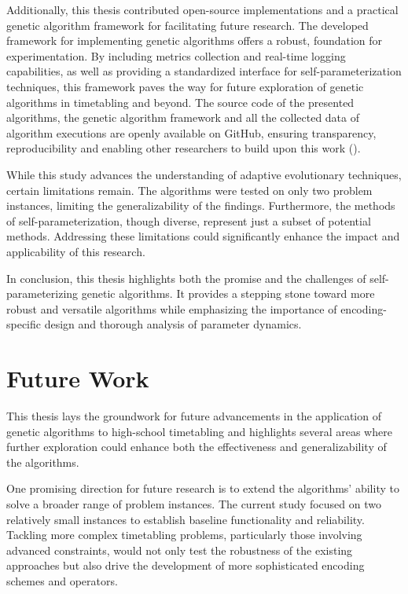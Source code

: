 \documentclass[english,examples]{isasthesis}
\begin{document}
Additionally, this thesis contributed open-source implementations and a
practical genetic algorithm framework for facilitating future research.
The developed framework for implementing genetic algorithms offers a robust,
foundation for experimentation. By including metrics collection and real-time
logging capabilities, as well as providing a standardized interface for
self-parameterization techniques, this framework paves the way for future
exploration of genetic algorithms in timetabling and beyond.
The source code of the presented algorithms, the genetic algorithm framework
and all the collected data of algorithm executions are openly available
on GitHub, ensuring transparency, reproducibility and enabling other
researchers to build upon this work (\cite{code-gax,code-gax-plots}).

While this study advances the understanding of adaptive evolutionary techniques,
certain limitations remain. The algorithms were tested on only two problem
instances, limiting the generalizability of the findings. Furthermore, the
methods of self-parameterization, though diverse, represent just a subset of
potential methods. Addressing these limitations could significantly enhance the
impact and applicability of this research.

In conclusion, this thesis highlights both the promise and the challenges of
self-parameterizing genetic algorithms. It provides a stepping stone toward
more robust and versatile algorithms while emphasizing the importance of
encoding-specific design and thorough analysis of parameter dynamics.


\chapter{Future Work}
This thesis lays the groundwork for future advancements in the application of
genetic algorithms to high-school timetabling and highlights several areas
where further exploration could enhance both the effectiveness and
generalizability of the algorithms.

One promising direction for future research is to extend the algorithms'
ability to solve a broader range of problem instances.
The current study focused on two relatively small instances to establish
baseline functionality and reliability.
Tackling more complex timetabling problems, particularly those involving
advanced constraints, would not only test the robustness of the existing
approaches but also drive the development of more sophisticated encoding
schemes and operators.
\end{document}
